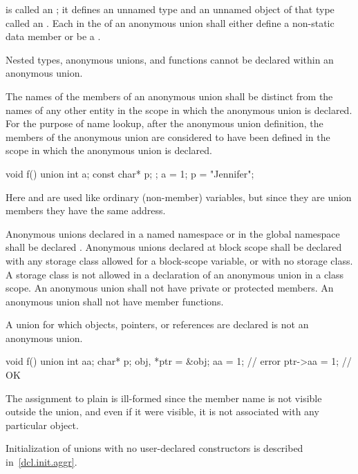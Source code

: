 is called an ; it defines an unnamed type and
an unnamed object of that type called an .
Each  in the 
of an anonymous union shall either define a non-static data member or be a
.
\begin{note}
Nested types, anonymous unions, and functions cannot be declared within an anonymous
union.
\end{note}
The names of the members of an anonymous union shall be distinct from
the names of any other entity in the scope in which the anonymous union
is declared. For the purpose of name lookup, after the anonymous union
definition, the members of the anonymous union are considered to have
been defined in the scope in which the anonymous union is declared.
%
\begin{example}

\begin{codeblock}
void f() {
  union { int a; const char* p; };
  a = 1;
  p = "Jennifer";
}
\end{codeblock}

Here  and  are used like ordinary (non-member)
variables, but since they are union members they have the same address.
\end{example}

\pnum
{}%
%
Anonymous unions declared in a named namespace or in the global
namespace shall be declared . Anonymous unions declared at
block scope shall be declared with any storage class allowed for a
block-scope variable, or with no storage class. A storage class is not
allowed in a declaration of an anonymous union in a class scope.
%
%
An anonymous union shall not have private or protected
members. An anonymous union shall not have
member functions.

\pnum
A union for which objects, pointers, or references are declared is not an anonymous union.
\begin{example}

\begin{codeblock}
void f() {
  union { int aa; char* p; } obj, *ptr = &obj;
  aa = 1;           // error
  ptr->aa = 1;      // OK
}
\end{codeblock}

The assignment to plain  is ill-formed since the member name
is not visible outside the union, and even if it were visible, it is not
associated with any particular object.
\end{example}
\begin{note}
Initialization of unions with no user-declared constructors is described
in~\ref{dcl.init.aggr}.
\end{note}

